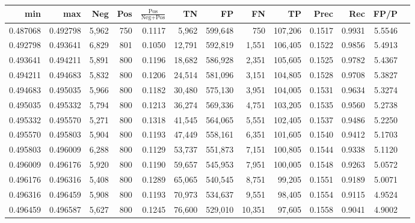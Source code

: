 \begin{tabular}{rrrrrrrrrrrrr}
\toprule
     min &      max &   Neg & Pos & $\frac{\text{Pos}}{\text{Neg}+\text{Pos}}$ &      TN &      FP &      FN &      TP &   Prec &    Rec &   FP/P \\
\midrule
0.487068 & 0.492798 & 5,962 & 750 &                                     0.1117 &   5,962 & 599,648 &     750 & 107,206 & 0.1517 & 0.9931 & 5.5546 \\
0.492798 & 0.493641 & 6,829 & 801 &                                     0.1050 &  12,791 & 592,819 &   1,551 & 106,405 & 0.1522 & 0.9856 & 5.4913 \\
0.493641 & 0.494211 & 5,891 & 800 &                                     0.1196 &  18,682 & 586,928 &   2,351 & 105,605 & 0.1525 & 0.9782 & 5.4367 \\
0.494211 & 0.494683 & 5,832 & 800 &                                     0.1206 &  24,514 & 581,096 &   3,151 & 104,805 & 0.1528 & 0.9708 & 5.3827 \\
0.494683 & 0.495035 & 5,966 & 800 &                                     0.1182 &  30,480 & 575,130 &   3,951 & 104,005 & 0.1531 & 0.9634 & 5.3274 \\
0.495035 & 0.495332 & 5,794 & 800 &                                     0.1213 &  36,274 & 569,336 &   4,751 & 103,205 & 0.1535 & 0.9560 & 5.2738 \\
0.495332 & 0.495570 & 5,271 & 800 &                                     0.1318 &  41,545 & 564,065 &   5,551 & 102,405 & 0.1537 & 0.9486 & 5.2250 \\
0.495570 & 0.495803 & 5,904 & 800 &                                     0.1193 &  47,449 & 558,161 &   6,351 & 101,605 & 0.1540 & 0.9412 & 5.1703 \\
0.495803 & 0.496009 & 6,288 & 800 &                                     0.1129 &  53,737 & 551,873 &   7,151 & 100,805 & 0.1544 & 0.9338 & 5.1120 \\
0.496009 & 0.496176 & 5,920 & 800 &                                     0.1190 &  59,657 & 545,953 &   7,951 & 100,005 & 0.1548 & 0.9263 & 5.0572 \\
0.496176 & 0.496316 & 5,408 & 800 &                                     0.1289 &  65,065 & 540,545 &   8,751 &  99,205 & 0.1551 & 0.9189 & 5.0071 \\
0.496316 & 0.496459 & 5,908 & 800 &                                     0.1193 &  70,973 & 534,637 &   9,551 &  98,405 & 0.1554 & 0.9115 & 4.9524 \\
0.496459 & 0.496587 & 5,627 & 800 &                                     0.1245 &  76,600 & 529,010 &  10,351 &  97,605 & 0.1558 & 0.9041 & 4.9002 \\

\end{tabular}

